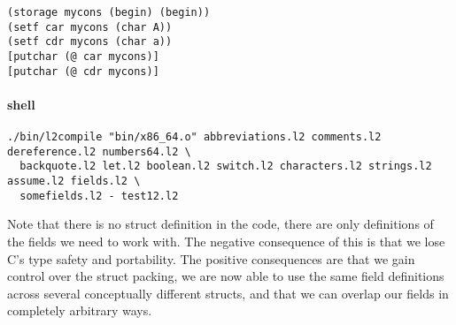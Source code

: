\documentclass[]{article}
\let\oldparagraph\paragraph
\renewcommand{\paragraph}[1]{\oldparagraph{#1}\mbox{}}
\begin{document}
\begin{verbatim}
(storage mycons (begin) (begin))
(setf car mycons (char A))
(setf cdr mycons (char a))
[putchar (@ car mycons)]
[putchar (@ cdr mycons)]
\end{verbatim}

\paragraph{shell}\label{shell-11}

\begin{verbatim}
./bin/l2compile "bin/x86_64.o" abbreviations.l2 comments.l2 dereference.l2 numbers64.l2 \
  backquote.l2 let.l2 boolean.l2 switch.l2 characters.l2 strings.l2 assume.l2 fields.l2 \
  somefields.l2 - test12.l2
\end{verbatim}

Note that there is no struct definition in the code, there are only
definitions of the fields we need to work with. The negative consequence
of this is that we lose C's type safety and portability. The positive
consequences are that we gain control over the struct packing, we are
now able to use the same field definitions across several conceptually
different structs, and that we can overlap our fields in completely
arbitrary ways.
\end{document}
